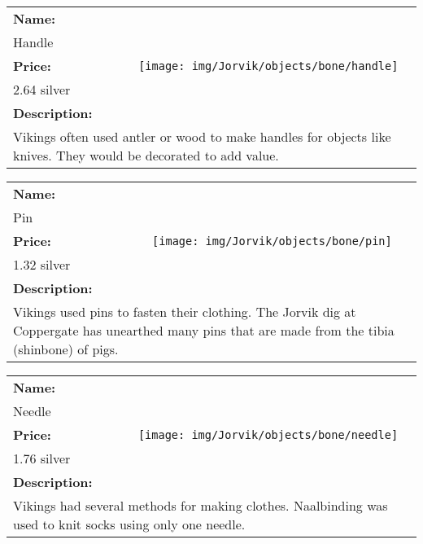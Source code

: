 \begin{table}[ht!]
	\centering
	\begin{tabular}{ p{3cm} c }\toprule
		\textbf{Name:} & \multirow{5}{*}{\texttt{[image: img/Jorvik/objects/bone/handle]}}\\
		Handle & \\ 
		\textbf{Price:} & \\
		2.64 silver & \\ 
		\textbf{Description:} & \\
		\multicolumn{2}{p{12cm}}{Vikings often used antler or wood to make handles for objects like knives. They would be decorated to add value.}\\
		\bottomrule
	\end{tabular}
\end{table}

\begin{table}[ht!]
	\centering
	\begin{tabular}{ p{3cm} c }\toprule
		\textbf{Name:} & \multirow{5}{*}{\texttt{[image: img/Jorvik/objects/bone/pin]}}\\
		Pin & \\ 
		\textbf{Price:} & \\
		1.32 silver & \\ 
		\textbf{Description:} & \\
		\multicolumn{2}{p{12cm}}{Vikings used pins to fasten their clothing. The Jorvik dig at Coppergate has unearthed many pins that are made from the tibia (shinbone) of pigs.}\\
		\bottomrule
	\end{tabular}
\end{table}

\begin{table}[ht!]
	\centering
	\begin{tabular}{ p{3cm} c }\toprule
		\textbf{Name:} & \multirow{5}{*}{\texttt{[image: img/Jorvik/objects/bone/needle]}}\\
		Needle & \\ 
		\textbf{Price:} & \\
		1.76 silver & \\ 
		\textbf{Description:} & \\
		\multicolumn{2}{p{12cm}}{Vikings had several methods for making clothes. Naalbinding was used to knit socks using only one needle. }\\
		\bottomrule
	\end{tabular}
\end{table}


